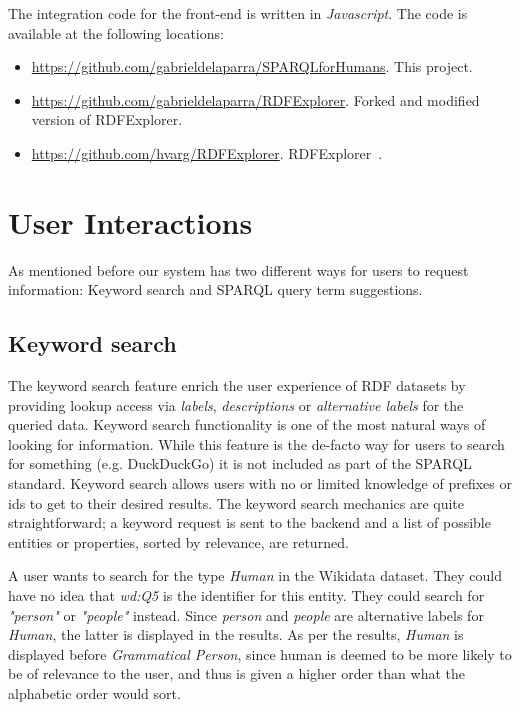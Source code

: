 The integration code for the front-end is written in \textit{Javascript}. The code is available at the following locations:
\begin{itemize}
    \item \url{https://github.com/gabrieldelaparra/SPARQLforHumans}. This project.
    \item \url{https://github.com/gabrieldelaparra/RDFExplorer}. Forked and modified version of RDFExplorer.
    \item \url{https://github.com/hvarg/RDFExplorer}. RDFExplorer~\cite{Vargas2019}.
\end{itemize}

\section{User Interactions}

As mentioned before our system has two different ways for users to request information: 
Keyword search 
and SPARQL query term suggestions.

\subsection{Keyword search}

The keyword search feature enrich the user experience of RDF datasets by providing lookup access via \textit{labels}, \textit{descriptions} or \textit{alternative labels} for the queried data. 
Keyword search functionality is one of the most natural ways of looking for information. 
While this feature is the de-facto way for users to search for something (e.g. DuckDuckGo) it is not included as part of the SPARQL standard. 
Keyword search allows users with no or limited knowledge of prefixes or ids to get to their desired results. 
The keyword search mechanics are quite straightforward; a keyword request is sent to the backend and a list of possible entities or properties, sorted by relevance, are returned. 

\begin{example}
A user wants to search for the type \textit{Human} in the Wikidata dataset. 
They could have no idea that \textit{wd:Q5} is the identifier for this entity. 
They could search for \textit{"person"} or \textit{"people"} instead. 
Since \textit{person} and \textit{people} are alternative labels for \textit{Human}, the latter is displayed in the results. 
As per the results, \textit{Human} is displayed before \textit{Grammatical Person}, since human is deemed to be more likely to be of relevance to the user, and thus is given a higher order than what the alphabetic order would sort.
\end{example}

